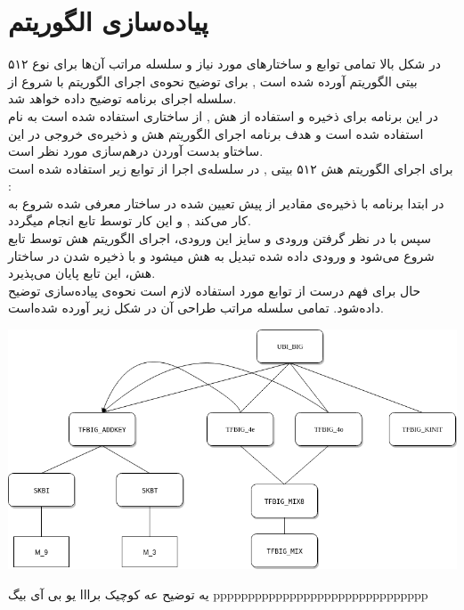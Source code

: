 \section{پیاده‌سازی الگوریتم}
در شکل بالا تمامی توابع و ساختارهای مورد نیاز  و سلسله مراتب آن‌ها برای نوع ۵۱۲ بیتی الگوریتم آورده شده است , برای توضیح نحوه‌ی اجرای الگوریتم با شروع از  
 سلسله اجرای برنامه توضیح داده خواهد شد.
\\
در این برنامه برای ‌ذخیره و استفاده از هش , از ساختاری استفاده شده است به نام \hyperref[subsec:sph-skein-big-context]{} استفاده شده است و هدف برنامه اجرای الگوریتم هش و ذخیره‌ی خروجی در این ساختاو بدست آوردن درهم‌سازی مورد نظر است.
\\
برای اجرای الگوریتم هش ۵۱۲ بیتی , در سلسله‌ی اجرا از توابع زیر استفاده شده است :
\\
در ابتدا برنامه با ذخیره‌ی مقادیر از پیش تعیین شده  \hyperref[subsec:IV512]{} در ساختار معرفی شده شروع به کار می‌کند , و این کار توسط تابع
\hyperref[subsec:sph-skein512-init]{}
   انجام میگردد.
  \\ سپس با در نظر گرفتن ورودی و سایز این ورودی، اجرای الگوریتم هش  توسط تابع \hyperref[subsec:sph-skein512]{}
   شروع می‌شود و ورودی داده شده تبدیل به هش میشود و با ذخیره شدن در ساختار  هش، این تابع پایان می‌پذیرد.
  \\ 
  حال برای فهم درست از توابع مورد استفاده لازم است نحوه‌ی پیاده‌سازی \hyperref[subsec:UBI-BIG]{} توضیح داده‌شود. تمامی سلسله مراتب طراحی آن در شکل زیر آورده شده‌است.
  \begin{center}
  		\includegraphics[width=16cm]{Images/GoldenModelDocumentation/UBI.png}	
  \end{center}
  
یه توضیح عه کوچیک برااا یو بی آی بیگ   ppppppppppppppppppppppppppppppp

